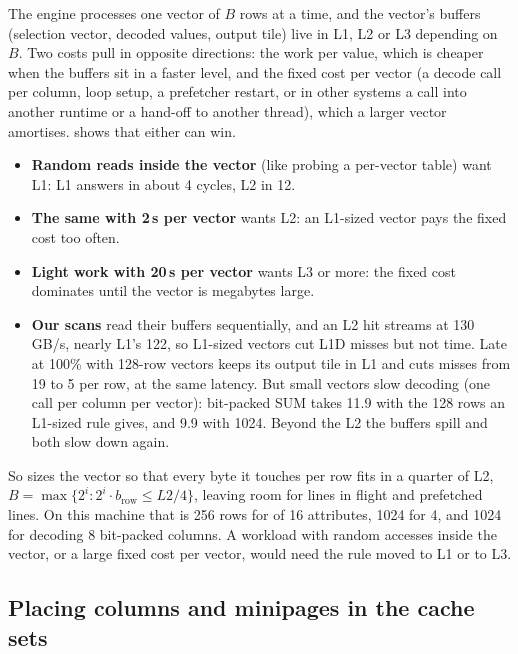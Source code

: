 The engine processes one vector of $B$ rows at a time, and the vector's buffers (selection
vector, decoded values, output tile) live in L1, L2 or L3 depending on $B$. Two costs pull in
opposite directions: the work per value, which is cheaper when the buffers sit in a faster
level, and the fixed cost per vector (a decode call per column, loop setup, a prefetcher
restart, or in other systems a call into another runtime or a hand-off to another thread),
which a larger vector amortises.  shows that either can win.
\begin{itemize}
\item \textbf{Random reads inside the vector} (like probing a per-vector table) want L1: L1
answers in about 4 cycles, L2 in 12.
\item \textbf{The same with 2\,\textmu s per vector} wants L2: an L1-sized vector pays the fixed
cost too often.
\item \textbf{Light work with 20\,\textmu s per vector} wants L3 or more: the fixed cost
dominates until the vector is megabytes large.
\item \textbf{Our scans} read their buffers sequentially, and an L2 hit streams at 130\,GB/s,
nearly L1's 122, so L1-sized vectors cut L1D misses but not time. Late  at
100\% with 128-row vectors keeps its output tile in L1 and cuts misses from 19 to 5 per row,
at the same latency. But small vectors slow decoding (one call per column per vector):
bit-packed SUM takes 11.9\ms{} with the 128 rows an L1-sized rule gives, and 9.9\ms{} with
1024. Beyond the L2 the buffers spill and both slow down again.
\end{itemize}
So  sizes the vector so that every byte it touches per row fits in a quarter
of L2, $B = \max\{2^i : 2^i \cdot b_\text{row} \le L2/4\}$, leaving room for lines in flight and
prefetched lines. On this machine that is 256 rows for  of 16 attributes, 1024
for 4, and 1024 for decoding 8 bit-packed columns. A workload with random accesses inside the
vector, or a large fixed cost per vector, would need the rule moved to L1 or to L3.

\subsection{Placing columns and minipages in the cache sets}
\label{sec:tuning:place}

